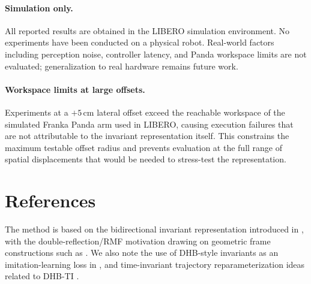 \documentclass[11pt]{article}
\begin{document}
\paragraph{Simulation only.}
All reported results are obtained in the LIBERO simulation environment. No experiments have been conducted on a physical robot. Real-world factors including perception noise, controller latency, and Panda workspace limits are not evaluated; generalization to real hardware remains future work.

\paragraph{Workspace limits at large offsets.}
Experiments at a $+5$\,cm lateral offset exceed the reachable workspace of the simulated Franka Panda arm used in LIBERO, causing execution failures that are not attributable to the invariant representation itself. This constrains the maximum testable offset radius and prevents evaluation at the full range of spatial displacements that would be needed to stress-test the representation.

\section{References}
The method is based on the bidirectional invariant representation introduced in \cite{soloperto2015icra,lee2018autonomous}, with the double-reflection/RMF motivation drawing on geometric frame constructions such as \cite{wang2008rmf}. We also note the use of DHB-style invariants as an imitation-learning loss in \cite{seo2025legato}, and time-invariant trajectory reparameterization ideas related to DHB-TI \cite{vakanski2023invariant,turaga2009grassmann}.
\end{document}
